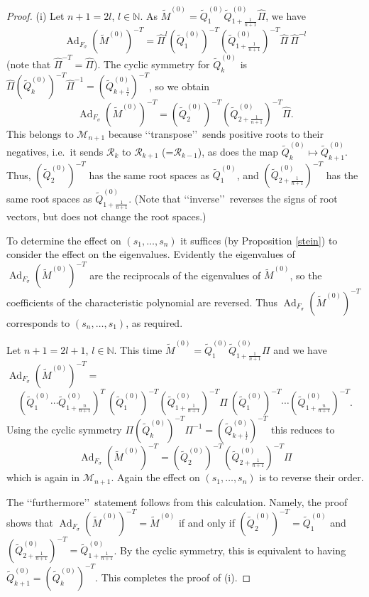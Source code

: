 \documentclass[a4paper,12pt,leqno]{amsart}
\numberwithin{equation}{section}
\theoremstyle{plain}
\theoremstyle{definition}
\newcommand{\N}{\mathbb N}
\newcommand{\si}{\sigma}
\DeclareMathOperator{\Ad}{Ad}
\newcommand{\cR}{\mathcal{R}}
\newcommand{\cM}{\mathcal{M}}
\renewcommand{\ll}{\lq\lq}
\newcommand{\rr}{\rq\rq\ }
\newcommand{\tQz}{  \tilde Q^{(0)}  }
\newcommand{\tMz}{  \tilde M^{(0)}  }
\begin{document}
\begin{proof} (i) Let $n+1=2l$, $l\in\N$.  As $\tMz=
\tQz_1\tQz_{1+\scriptstyle\frac1{n+1}}\hat\Pi$, we have
\[
\Ad_{F_\si} (\tMz)^{-T}=
\hat\Pi^l (\tQz_1)^{-T} (\tQz_{1+\scriptstyle\frac1{n+1}})^{-T} \hat\Pi\ \hat\Pi^{-l}
\]
(note that $\hat\Pi^{-T}=\hat\Pi$).  The cyclic symmetry for $\tQz_k$
is
$\hat\Pi (\tQz_k)^{-T} \hat\Pi^{-1} = (\tQz_{k+\scriptstyle\frac1{l}})^{-T}$, so we obtain
\[
\Ad_{F_\si} (\tMz)^{-T}=
(\tQz_2)^{-T} (\tQz_{2+\scriptstyle\frac1{n+1}})^{-T} \hat\Pi.
\]
This belongs to $\cM_{n+1}$ because \ll transpose\rr sends positive roots to their negatives, i.e.\
it sends $\cR_k$ to $\cR_{k+1}$ (=$\cR_{k-1}$), as does the map
$\tQz_k\mapsto \tQz_{k+1}$.  Thus,
$(\tQz_2)^{-T}$ has the same root spaces as $\tQz_1$, and
$(\tQz_{2+\scriptstyle\frac1{n+1}})^{-T}$ has the same root spaces as
$\tQz_{1+\scriptstyle\frac1{n+1}}$.
(Note that \ll inverse\rr reverses the signs of root vectors, but does not change the root spaces.)

To determine the effect on $(s_1,\dots,s_n)$ it suffices (by Proposition \ref{stein}) to consider the
effect on the eigenvalues.  Evidently the eigenvalues of $\Ad_{F_\si} (\tMz)^{-T}$ are the reciprocals
of the eigenvalues of $\tMz$, so the coefficients of the characteristic polynomial are reversed.
Thus $\Ad_{F_\si} (\tMz)^{-T}$ corresponds to $(s_n,\dots,s_1)$, as required.

Let $n+1=2l+1$, $l\in\N$.   This time
$\tMz=
\tQz_1\tQz_{1+\scriptstyle\frac1{n+1}}\Pi$
and we have
$\Ad_{F_\si} (\tMz)^{-T}=$
\[
\left(
\tQz_1 \cdots \tQz_{1+\scriptstyle\frac n{n+1}}
\right)^T
\
(\tQz_1)^{-T} (\tQz_{1+\scriptstyle\frac1{n+1}})^{-T} \Pi
\
(\tQz_1)^{-T} \cdots (\tQz_{1+\scriptstyle\frac n{n+1}})^{-T}.
\]
Using the cyclic symmetry
$\Pi (\tQz_k)^{-T} \Pi^{-1} = (\tQz_{k+\scriptstyle\frac1{l}})^{-T}$
this reduces to
\[
\Ad_{F_\si} (\tMz)^{-T}=
(\tQz_2)^{-T} (\tQz_{2+\scriptstyle\frac1{n+1}})^{-T} \Pi
\]
which is again in $\cM_{n+1}$. Again the effect on  $(s_1,\dots,s_n)$ is
to reverse their order.

The \ll furthermore\rr statement follows from this calculation.
Namely, the proof shows that
$\Ad_{F_\si} (\tMz)^{-T}=\tMz$ if and only if
$(\tQz_2)^{-T}=\tQz_1$ and
$(\tQz_{2+\scriptstyle\frac1{n+1}})^{-T} = \tQz_{1+\scriptstyle\frac1{n+1}}$.
By the cyclic symmetry, this is equivalent to having
$\tQz_{k+1}=(\tQz_k)^{-T}$.
This completes the proof of (i).


\end{proof}
\end{document}
